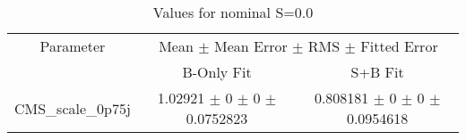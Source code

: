 \begin{table}
\centering
\caption{Values for nominal S=0.0}
\begin{tabular}{ccc}
\toprule
Parameter & \multicolumn{2}{c}{Mean $\pm$ Mean Error $\pm$ RMS $\pm$ Fitted Error}\\
 & B-Only Fit & S+B Fit\\
\midrule
CMS\_scale\_0p75j & \num{1.02921} $\pm$ \num{0} $\pm$ \num{0} $\pm$ \num{0.0752823} & \num{0.808181} $\pm$ \num{0} $\pm$ \num{0} $\pm$ \num{0.0954618}\\
\bottomrule
\end{tabular}
\end{table}